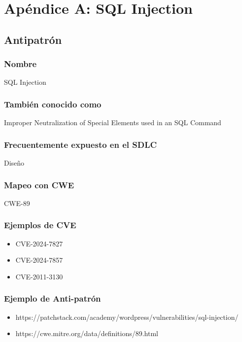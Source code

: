 \chapter{Apéndice A: SQL Injection}

\section{Antipatrón}

\subsection{Nombre}
SQL Injection

\subsection{También conocido como}
Improper Neutralization of Special Elements used in an SQL Command

\subsection{Frecuentemente expuesto en el SDLC} 
Diseño

\subsection{Mapeo con CWE} 
CWE-89

\subsection{Ejemplos de CVE} 
\begin{itemize}
    \item CVE-2024-7827
    \item CVE-2024-7857
    \item CVE-2011-3130
\end{itemize}

\subsection{Ejemplo de Anti-patrón}
\begin{itemize}
    \item https://patchstack.com/academy/wordpress/vulnerabilities/sql-injection/
    \item https://cwe.mitre.org/data/definitions/89.html
    
\end{itemize}

